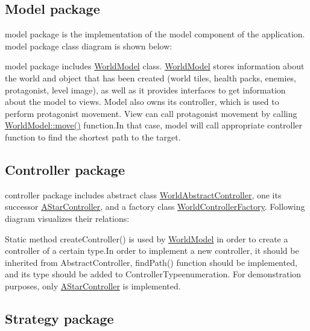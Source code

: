 \subsection*{Model package}

{\ttfamily model} package is the implementation of the model component of the application. {\ttfamily model} package class diagram is shown below\+:



{\ttfamily model} package includes {\ttfamily \hyperlink{classWorldModel}{World\+Model}} class. {\ttfamily \hyperlink{classWorldModel}{World\+Model}} stores information about the world and object that has been created (world tiles, health packs, enemies, protagonist, level image), as well as it provides interfaces to get information about the model to views. Model also owns its controller, which is used to perform protagonist movement. View can call protagonist movement by calling {\ttfamily \hyperlink{classWorldModel_ae02716d99230f6edb0f7caf5b469bc1c}{World\+Model\+::move()}} function.\+In that case, model will call appropriate controller function to find the shortest path to the target.

\subsection*{Controller package}

{\ttfamily controller} package includes abstract class {\ttfamily \hyperlink{classWorldAbstractController}{World\+Abstract\+Controller}}, one its successor {\ttfamily \hyperlink{classAStarController}{A\+Star\+Controller}}, and a factory class {\ttfamily \hyperlink{classWorldControllerFactory}{World\+Controller\+Factory}}. Following diagram visualizes their relations\+:



Static method {\ttfamily create\+Controller()} is used by \hyperlink{classWorldModel}{World\+Model} in order to create a controller of a certain type.\+In order to implement a new controller, it should be inherited from {\ttfamily Abstract\+Controller}, {\ttfamily find\+Path()} function should be implemented, and its type should be added to {\ttfamily Controller\+Type}enumeration. For demonstration purposes, only {\ttfamily \hyperlink{classAStarController}{A\+Star\+Controller}} is implemented.

\subsection*{Strategy package}


